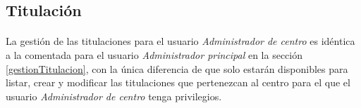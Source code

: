 \subsection{Titulación}

  \paragraph{}La gestión de las titulaciones para el usuario
  \textit{Administrador de centro} es idéntica a la comentada para el usuario
  \textit{Administrador principal} en la sección \ref{gestionTitulacion}, con la
  única diferencia de que solo estarán disponibles para listar, crear y
  modificar las titulaciones que pertenezcan al centro para el que el usuario
  \textit{Administrador de centro} tenga privilegios.
